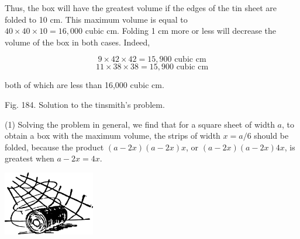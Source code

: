 Thus, the box will have the greatest volume if the edges of the tin sheet are folded to 10 cm. This maximum volume is equal to \(40 \times 40 \times 10 = 16,000 \text{ cubic cm}\). Folding 1 cm more or less will decrease the volume of the box in both cases. Indeed,

\[9 \times 42 \times 42 = 15,900 \text{ cubic cm}\]
\[11 \times 38 \times 38 = 15,900 \text{ cubic cm}\]

both of which are less than 16,000 cubic cm.



Fig. 184. Solution to the tinsmith's problem.

(1) Solving the problem in general, we find that for a square sheet of width \(a\), to obtain a box with the maximum volume, the strips of width \(x = a/6 \) should be folded, because the product \((a - 2x)(a - 2x)x\), or \((a - 2x)(a - 2x)4x\), is greatest when \(a - 2x = 4x\).

\begin{center}
\includegraphics[width=0.3\textwidth]{figures/ch-11/fig-ch-11-tail.pdf}
\end{center}


















